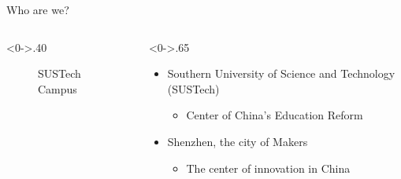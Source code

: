 \documentclass{beamer}
\begin{document}
\begin{frame}{Who are we?}
  \begin{columns}[T] %
    \begin{column}<0->{.40\textwidth}
      \begin{figure}[thpb]
        \centering
        \caption{SUSTech Campus}
        \label{fig:campus}
      \end{figure}
    \end{column}%
    \hfill%
    \begin{column}<0->{.65\textwidth}
      \begin{itemize}
        \item<1-> Southern University of Science and Technology (SUSTech)
        \begin{itemize}
          \item<1-> Center of China's Education Reform
        \end{itemize}
        \item<2-> Shenzhen, the city of Makers
        \begin{itemize}
          \item<2-> The center of innovation in China
        \end{itemize}
      \end{itemize}
    \end{column}%
  \end{columns}
\end{frame}
\end{document}
